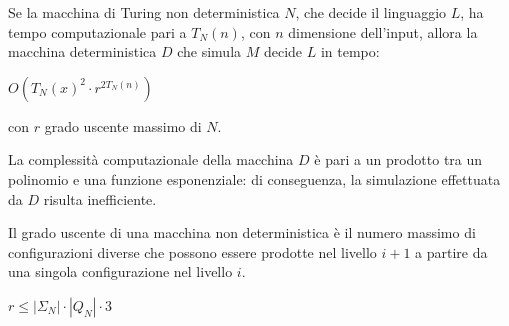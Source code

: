 \begin{thm}
    Se la macchina di Turing non deterministica $N$, che decide il linguaggio $L$, ha tempo computazionale pari a $T_N (n)$, con $n$ dimensione dell'input, allora la macchina deterministica $D$ che simula $M$ decide $L$ in tempo: 
    \begin{center}
        $O\left( {T_N (x)}^2 \cdot r^{2T_N (n)} \right)$
    \end{center}
    con $r$ grado uscente massimo di $N$.
\end{thm}
\begin{rem}
    La complessità computazionale della macchina $D$ è pari a un prodotto tra un polinomio e una funzione esponenziale: di conseguenza, la simulazione effettuata da $D$ risulta inefficiente.
\end{rem}
Il grado uscente di una macchina non deterministica è il numero massimo di configurazioni diverse che possono essere prodotte nel livello $i+1$ a partire da una singola configurazione nel livello $i$.
\begin{center}
    $r \le |\Sigma_N| \cdot |Q_N| \cdot 3$
\end{center}
